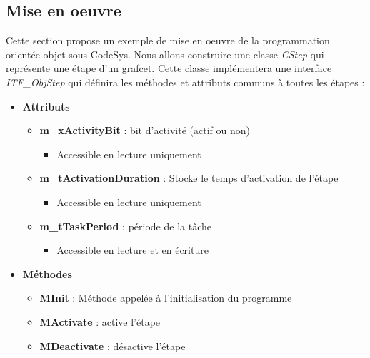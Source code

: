 \subsection{Mise en oeuvre}
Cette section propose un exemple de mise en oeuvre de la programmation orientée objet sous CodeSys. Nous allons construire une classe \emph{CStep} qui représente une étape d'un grafcet. Cette classe implémentera une interface \emph{ITF\_ObjStep} qui définira les méthodes et attributs communs à toutes les étapes : 
\begin{itemize}
    \item \textbf{Attributs}
          \begin{itemize}
              \item \textbf{m\_xActivityBit} : bit d'activité (actif ou non)
                    \begin{itemize}
                        \item Accessible en lecture uniquement
                    \end{itemize}
              \item \textbf{m\_tActivationDuration} : Stocke le temps d'activation de l'étape
                    \begin{itemize}
                        \item Accessible en lecture uniquement
                    \end{itemize}
              \item \textbf{m\_tTaskPeriod} : période de la tâche
                    \begin{itemize}
                        \item Accessible en lecture et en écriture
                    \end{itemize}
          \end{itemize}
    \item \textbf{Méthodes}
    \begin{itemize}
        \item \textbf{MInit} : Méthode appelée à l'initialisation du programme
        \item \textbf{MActivate} : active l'étape
        \item \textbf{MDeactivate} : désactive l'étape
    \end{itemize}
\end{itemize}

